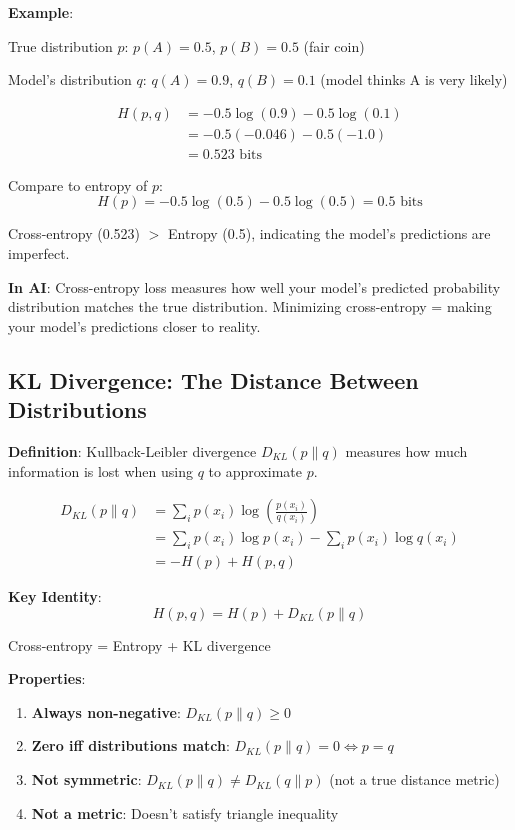 \documentclass[11pt,oneside]{book}
\begin{document}
\textbf{Example}:

True distribution $p$: $p(A) = 0.5$, $p(B) = 0.5$ (fair coin)

Model's distribution $q$: $q(A) = 0.9$, $q(B) = 0.1$ (model thinks A is very likely)

\begin{align*}
H(p, q) &= -0.5 \log(0.9) - 0.5 \log(0.1) \\
        &= -0.5(-0.046) - 0.5(-1.0) \\
        &= 0.523 \text{ bits}
\end{align*}

Compare to entropy of $p$:
\[
H(p) = -0.5 \log(0.5) - 0.5 \log(0.5) = 0.5 \text{ bits}
\]

Cross-entropy (0.523) $>$ Entropy (0.5), indicating the model's predictions are imperfect.

\textbf{In AI}: Cross-entropy loss measures how well your model's predicted probability distribution matches the true distribution. Minimizing cross-entropy = making your model's predictions closer to reality.

\subsection{KL Divergence: The Distance Between Distributions}

\textbf{Definition}: Kullback-Leibler divergence $D_{KL}(p \| q)$ measures how much information is lost when using $q$ to approximate $p$.

\begin{align*}
D_{KL}(p \| q) &= \sum_{i} p(x_i) \log\left(\frac{p(x_i)}{q(x_i)}\right) \\
               &= \sum_{i} p(x_i) \log p(x_i) - \sum_{i} p(x_i) \log q(x_i) \\
               &= -H(p) + H(p, q)
\end{align*}

\textbf{Key Identity}:
\[
H(p, q) = H(p) + D_{KL}(p \| q)
\]

Cross-entropy = Entropy + KL divergence

\textbf{Properties}:
\begin{enumerate}
\item \textbf{Always non-negative}: $D_{KL}(p \| q) \geq 0$
\item \textbf{Zero iff distributions match}: $D_{KL}(p \| q) = 0 \Longleftrightarrow p = q$
\item \textbf{Not symmetric}: $D_{KL}(p \| q) \neq D_{KL}(q \| p)$ (not a true distance metric)
\item \textbf{Not a metric}: Doesn't satisfy triangle inequality
\end{enumerate}
\end{document}
